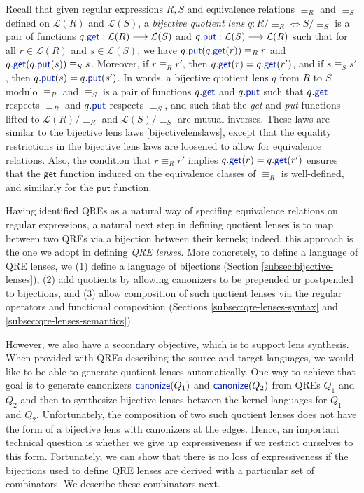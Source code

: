 \documentclass[acmsmall,screen]{acmart}
\newcommand{\kw}[1]{\textcolor{dkblue}{\ensuremath{\mathsf{#1}}}}
\newcommand{\canonize}{\ensuremath{\kw{canonize}}}
\newcommand{\get}{\ensuremath{\kw{get}}}
\newcommand{\lput}{\ensuremath{\kw{put}}}
\begin{document}
Recall that given regular expressions $R, S$ and equivalence relations
$\equiv_R$ and $\equiv_S$ defined on $\mathcal{L}(R)$ and $\mathcal{L}(S)$, a
{\em bijective quotient lens} $q : R /{\equiv_R} \Leftrightarrow S/{\equiv_S}$
is a pair of functions $q.\get : \mathcal{L}(R) \longrightarrow \mathcal{L}(S)$
and $q.\lput : \mathcal{L}(S) \longrightarrow \mathcal{L}(R)$ such that for all
$r \in \mathcal{L}(R)$ and $s \in \mathcal{L}(S)$, we have $q.\lput(q.\get(r))
\equiv_R r$ and $q.\get(q.\lput(s)) \equiv_S s$. Moreover, if $r \equiv_R
r'$, then $q.\get(r) = q.\get(r')$, and if $s \equiv_S s'$, then $q.\lput(s) =
q.\lput(s')$. In words, a bijective quotient lens $q$ from $R$ to $S$ modulo
$\equiv_R$ and $\equiv_S$ is a pair of functions $q.\get$ and $q.\lput$ such
that $q.\get$ respects $\equiv_R$ and $q.\lput$ respects $\equiv_S$, and such
that the {\em get} and {\em put} functions lifted to $\mathcal{L}(R)/{\equiv_R}$
and $\mathcal{L}(S)/{\equiv_S}$ are mutual inverses. These laws are similar to the
bijective lens laws \cref{bijectivelenslaws}, except that the equality
restrictions in the bijective lens laws are loosened to allow for equivalence
relations. Also, the condition that $r \equiv_R r'$ implies $q.\get(r) =
q.\get(r')$ ensures that the \kw{get} function induced on the equivalence
classes of $\equiv_R$ is well-defined, and similarly for the \kw{put}
function.

Having identified QREs as a natural way of specifing equivalence relations on
regular expressions, a natural next step in defining quotient lenses is to map
between two QREs via a bijection between their kernels; indeed, this approach
is the one we adopt in defining {\em QRE lenses}.
More concretely, to define a language of QRE lenses, we
(1) define a language of bijections (Section \ref{subsec:bijective-lenses}),
(2) add quotients by allowing canonizers to be prepended or postpended
to bijections, and 
(3) allow composition of such quotient lenses via the
regular operators and functional composition
(Sections \ref{subsec:qre-lenses-syntax} and \ref{subsec:qre-lenses-semantics}).

However, we also have a secondary objective, which is to support lens
synthesis. When provided with QREs describing the source and target
languages, we would like to be able to generate quotient lenses
automatically. One way to achieve that goal is to generate canonizers
$\canonize(Q_1)$ and $\canonize(Q_2)$ from QREs $Q_1$ and $Q_2$ and
then to synthesize bijective lenses between the kernel languages for
$Q_1$ and $Q_2$.
Unfortunately, the composition of two such quotient lenses does not have 
the form of a bijective lens with canonizers at the edges. Hence, an important
technical question is whether we give up expressiveness if we restrict
ourselves to this form. 
Fortunately, we can show that there is no loss of expressiveness if
the bijections used to define QRE lenses are derived with a particular
set of combinators.  We describe these combinators next.
\end{document}
